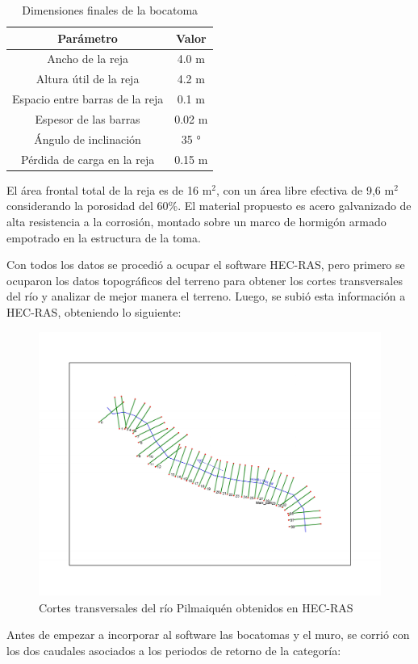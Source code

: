\documentclass{article} %
\begin{document}
\begin{table}[h]
    \centering
    \begin{tabular}{c c}
        \textbf{Parámetro} & \textbf{Valor} \\
        \hline
        Ancho de la reja & 4.0 m \\
        Altura útil de la reja & 4.2 m \\ 
        Espacio entre barras de la reja & 0.1 m \\
        Espesor de las barras & 0.02 m \\
        Ángulo de inclinación & 35 ° \\
        Pérdida de carga en la reja & 0.15 m \\ \hline
    \end{tabular}
    \caption{Dimensiones finales de la bocatoma}
\end{table}

El área frontal total de la reja es de 16 m$^2$, con un área libre efectiva de 9,6 m$^2$ considerando la porosidad del 60\%. El material propuesto es acero galvanizado de alta resistencia a la corrosión, montado sobre un marco de hormigón armado empotrado en la estructura de la toma.

Con todos los datos se procedió a ocupar el software HEC-RAS, pero primero se ocuparon los datos topográficos del terreno para obtener los cortes transversales del río y analizar de mejor manera el terreno. Luego, se subió esta información a HEC-RAS, obteniendo lo siguiente:

\begin{figure}[h!]
    \centering
    \includegraphics[width=0.6\linewidth]{imagenes/rio_sin_estruc.pdf}
    \caption{Cortes transversales del río Pilmaiquén obtenidos en HEC-RAS}
\end{figure}

Antes de empezar a incorporar al software las bocatomas y el muro, se corrió con los dos caudales asociados a los periodos de retorno de la categoría:
\end{document}
